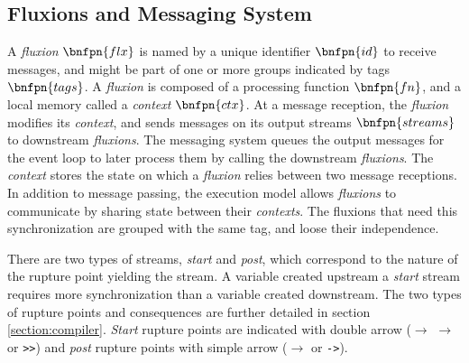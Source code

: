 \subsection{Fluxions and Messaging System}

A \textit{fluxion} $\bnfpn{flx}$ is named by a unique identifier $\bnfpn{id}$ to receive messages, and might be part of one or more groups indicated by tags $\bnfpn{tags}$.
A \textit{fluxion} is composed of a processing function $\bnfpn{fn}$, and a local memory called a \textit{context} $\bnfpn{ctx}$.
At a message reception, the \textit{fluxion} modifies its \textit{context}, and sends messages on its output streams $\bnfpn{streams}$ to downstream \textit{fluxions}.
The messaging system queues the output messages for the event loop to later process them by calling the downstream \textit{fluxions}.
The \textit{context} stores the state on which a \textit{fluxion} relies between two message receptions.
In addition to message passing, the execution model allows \textit{fluxions} to communicate by sharing state between their \textit{contexts}.
The fluxions that need this synchronization are grouped with the same tag, and loose their independence.

There are two types of streams, \textit{start} and \textit{post}, which correspond to the nature of the rupture point yielding the stream.
A variable created upstream a \textit{start} stream requires more synchronization than a variable created downstream.
The two types of rupture points and consequences are further detailed in section \ref{section:compiler}.
\textit{Start} rupture points are indicated with double arrow ($\to$ \hspace{-1.4em} $\to$ or \texttt{>>}) and \textit{post} rupture points with simple arrow ($\to$ or \texttt{->}).


